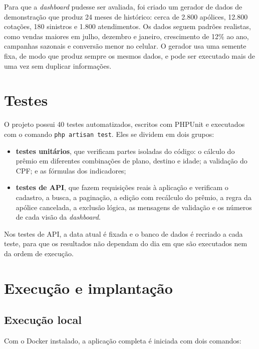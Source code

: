 \documentclass[12pt,a4paper]{article}
\begin{document}
Para que a \emph{dashboard} pudesse ser avaliada, foi criado um gerador de dados de demonstração
que produz 24 meses de histórico: cerca de 2.800 apólices, 12.800 cotações, 180 sinistros e 1.800
atendimentos. Os dados seguem padrões realistas, como vendas maiores em julho, dezembro e
janeiro, crescimento de 12\% ao ano, campanhas sazonais e conversão menor no celular. O gerador
usa uma semente fixa, de modo que produz sempre os mesmos dados, e pode ser executado mais de uma
vez sem duplicar informações.

\section{Testes}\label{sec:testes}

O projeto possui 40 testes automatizados, escritos com PHPUnit e executados com o comando
\texttt{php artisan test}. Eles se dividem em dois grupos:

\begin{itemize}
  \item \textbf{testes unitários}, que verificam partes isoladas do código: o cálculo do prêmio
        em diferentes combinações de plano, destino e idade; a validação do CPF; e as fórmulas
        dos indicadores;
  \item \textbf{testes de API}, que fazem requisições reais à aplicação e verificam o
        cadastro, a busca, a paginação, a edição com recálculo do prêmio, a regra da apólice
        cancelada, a exclusão lógica, as mensagens de validação e os números de cada visão da
        \emph{dashboard}.
\end{itemize}

Nos testes de API, a data atual é fixada e o banco de dados é recriado a cada teste, para que os
resultados não dependam do dia em que são executados nem da ordem de execução.

\section{Execução e implantação}\label{sec:execucao}

\subsection{Execução local}

Com o Docker instalado, a aplicação completa é iniciada com dois comandos:
\end{document}
